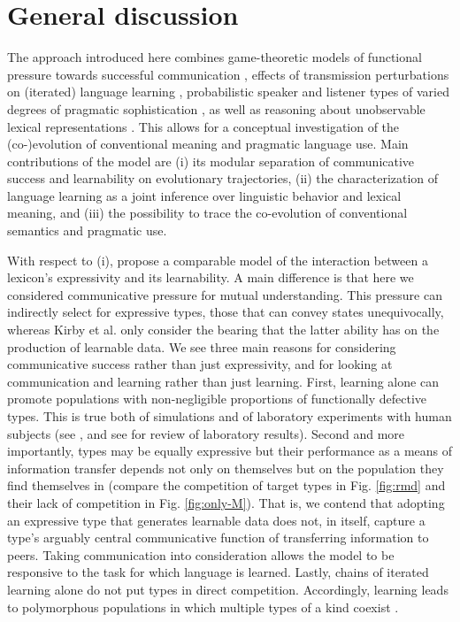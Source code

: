 \documentclass[a4paper, 11pt]{article}
\theoremstyle{Satz}
\begin{document}
\section{General discussion}\label{sec:discussion}
The approach introduced here combines game-theoretic models of functional pressure towards
successful communication \citep{nowak+krakauer:1999}, effects of transmission perturbations on
(iterated) language learning \citep{griffiths+kalish:2007}, probabilistic speaker and listener
types of varied degrees of pragmatic sophistication \citep{frank+goodman:2012,
  franke+jaeger:2014}, as well as reasoning about unobservable lexical representations
\citep{bergen+etal:2012,bergen+etal:2016}. This allows for a conceptual investigation of the
(co-)evolution of conventional meaning and pragmatic language use. Main contributions of the
model are (i) its modular separation of communicative success and learnability on evolutionary
trajectories, (ii) the characterization of language learning as a joint inference over
linguistic behavior and lexical meaning, and (iii) the possibility to trace the co-evolution of
conventional semantics and pragmatic use.

With respect to (i), \citet{kirby+etal:2015} propose a comparable model of the interaction
between a lexicon's expressivity and its learnability. A main difference is that here we
considered communicative pressure for mutual understanding. This pressure can indirectly select
for expressive types, those that can convey states unequivocally, whereas Kirby et al. only
consider the bearing that the latter ability has on the production of learnable data. We see
three main reasons for considering communicative success rather than just expressivity, and for
looking at communication and learning rather than just learning. First, learning alone can
promote populations with non-negligible proportions of functionally defective types. This is
true both of simulations and of laboratory experiments with human subjects (see
\citealt{kirby+etal:2008,silvey+etal:2014}, and see \citealt{fay+etal:2013} for review of
laboratory results). Second and more importantly, types may be equally expressive but their
performance as a means of information transfer depends not only on themselves but on the
population they find themselves in (compare the competition of target types in Fig.
\ref{fig:rmd} and their lack of competition in Fig. \ref{fig:only-M}). That is, we contend that
adopting an expressive type that generates learnable data does not, in itself, capture a type's
arguably central communicative function of transferring information to peers. Taking
communication into consideration allows the model to be responsive to the task for which
language is learned. Lastly, chains of iterated learning alone do not put types in direct
competition. Accordingly, learning leads to polymorphous populations in which multiple types of
a kind coexist \citep{nowak:2006}.
\end{document}
